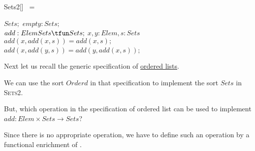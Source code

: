 \documentclass[landscape, autoslides, light]{mmiss}
\begin{document}
\begin{Package}[Label={FSDPT}, Title={Formal Specification of Data and Process Types}, ShortTitle={FSDPT}, Authors={Horst Reichel}, Date={February 2003}, LevelOfDetail=Lecture, Language=en-GB]
\begin{Section}[Title={Initial Algebras as Data Types}, Label={section3}]
\begin{Section}[Title={Data Refinement}, Label={section3_6}]
\begin{Paragraph}[Label=Paragraph81]
\end{Paragraph}
\begin{Paragraph}[Label=Paragraph82]
\begin{SpecDefn}{Sets2}[] ~=
\item[\Then] \item[\Free~\Group]
\begin{Items}
\I\Sort \(Sets; \) \I\Ops \( empty : Sets; \)
\\ \( add : Elem \* Sets \tfun Sets; \)
\I\Vars \( x,y: Elem, s: Sets\)
\\ \( add(x, add(x,s)) = add(x,s);\)
\\ \( add(x, add(y,s)) = add(y, add(x,s));\)
 ~\EndGroup \end{Items} \item[\End] \end{SpecDefn}

\end{Paragraph}
 \begin{Paragraph}[Label=Paragraph83]

 Next let us recall the generic specification of
 \hyperlink{orderdlists}{ordered lists}.\pause \vspace{8mm}

 We can use the sort $Orderd$ in that specification to implement
 the sort $Sets$ in \textsc{Sets2}. \pause \vspace{8mm}

  But, which operation in the
 specification of ordered list can be used to implement $add :
 Elem \times Sets \to Sets$? \pause \vspace{8mm}

 Since there is no appropriate
 operation, we have to define such an operation by a functional
 enrichment of .


\end{Paragraph}
\end{Section}
\end{Section}
\end{Package}
\end{document}
